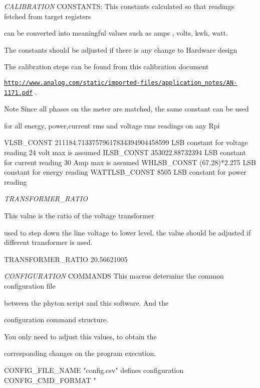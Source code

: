 \begin{DoxyItemize}
\item {\itshape C\-A\-L\-I\-B\-R\-A\-T\-I\-O\-N} C\-O\-N\-S\-T\-A\-N\-T\-S\-: This constants calculated so that readings fetched from target registers \par
 can be converted into meaningful values such as amps , volts, kwh, watt. \par
 The constants should be adjusted if there is any change to Hardware design \par
 The calibration steps can be found from this calibration document \par
 \href{http://www.analog.com/static/imported-files/application_notes/AN-1171.pdf}{\tt http\-://www.\-analog.\-com/static/imported-\/files/application\-\_\-notes/\-A\-N-\/1171.\-pdf} . \par
 \begin{DoxyNote}{Note}
Since all phases on the meter are matched, the same constant can be used \par
 for all energy, power,current rms and voltage rms readings on any Rpi
\end{DoxyNote}
\begin{DoxyVerb}VLSB_CONST              211184.71337579617834394904458599        LSB constant for voltage reading 24 volt max is assumed
ILSB_CONST              353022.88732394                          LSB constant for current reading 30 Amp max is assumed
WHLSB_CONST             (67.28)*2.275                            LSB constant for energy reading
WATTLSB_CONST           8505                                     LSB constant for power reading  \end{DoxyVerb}
\end{DoxyItemize}
\begin{DoxyItemize}
\item {\itshape T\-R\-A\-N\-S\-F\-O\-R\-M\-E\-R\-\_\-\-R\-A\-T\-I\-O} \par
 This value is the ratio of the voltage transformer \par
 used to step down the line voltage to lower level. the value should be adjusted if different transformer is used. \begin{DoxyVerb}  TRANSFORMER_RATIO         20.56621005\end{DoxyVerb}
\end{DoxyItemize}
\begin{DoxyItemize}
\item {\itshape C\-O\-N\-F\-I\-G\-U\-R\-A\-T\-I\-O\-N} C\-O\-M\-M\-A\-N\-D\-S This macros determine the common configuration file \par
 between the phyton script and this software. And the \par
 configuration command structure. \par
 You only need to adjust this values, to obtain the \par
 corresponding changes on the program execution. \begin{DoxyVerb} CONFIG_FILE_NAME       "config.csv"            defines configuration           
 CONFIG_CMD_FORMAT      "%
\end{DoxyVerb}
 \end{DoxyItemize}
